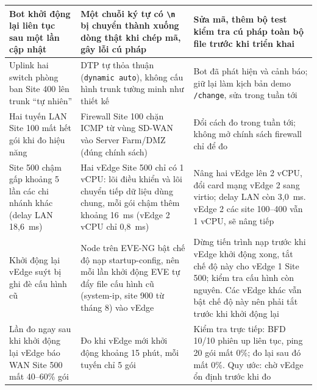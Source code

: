 \begin{longtable}{|P{3.4cm}|P{4.6cm}|P{4.8cm}|}
    \hline
    Bot khởi động lại liên tục sau một lần cập nhật & Một chuỗi ký tự có \texttt{\textbackslash n} bị chuyển thành xuống dòng thật khi chép mã, gây lỗi cú pháp & Sửa mã, thêm bộ test kiểm tra cú pháp toàn bộ file trước khi triển khai \\
    \hline
    Uplink hai switch phòng ban Site 400 lên trunk ``tự nhiên'' & DTP tự thỏa thuận (\texttt{dynamic auto}), không cấu hình trunk tường minh như thiết kế & Bot đã phát hiện và cảnh báo; giữ lại làm kịch bản demo \texttt{/change}, sửa trong tuần tới \\
    \hline
    Hai tuyến LAN Site 100 mất hết gói khi đo hiệu năng & Firewall Site 100 chặn ICMP từ vùng SD-WAN vào Server Farm/DMZ (đúng chính sách) & Đổi cách đo trong tuần tới; không mở chính sách firewall chỉ để đo \\
    \hline
    Site 500 chậm gấp khoảng 5 lần các chi nhánh khác (delay LAN 18,6~ms) & Hai vEdge Site 500 chỉ có 1 vCPU: lõi điều khiển và lõi chuyển tiếp dữ liệu dùng chung, mỗi gói chậm thêm khoảng 16~ms (vEdge 2 vCPU chỉ 0,8~ms) & Nâng hai vEdge lên 2 vCPU, đổi card mạng vEdge 2 sang virtio; delay LAN còn 3,0~ms. vEdge 2 các site 100--400 vẫn 1 vCPU, sẽ nâng tiếp \\
    \hline
    Khởi động lại vEdge suýt bị ghi đè cấu hình cũ & Node trên EVE-NG bật chế độ nạp startup-config, nên mỗi lần khởi động EVE tự đẩy file cấu hình cũ (system-ip, site 900 từ tháng 8) vào vEdge & Dừng tiến trình nạp trước khi vEdge khởi động xong, tắt chế độ này cho vEdge 1 Site 500; kiểm tra cấu hình còn nguyên. Các vEdge khác vẫn bật chế độ này nên phải tắt trước khi khởi động lại \\
    \hline
    Lần đo ngay sau khi khởi động lại vEdge báo WAN Site 500 mất 40--60\% gói & Đo khi vEdge mới khởi động khoảng 15 phút, mỗi tuyến chỉ 5 gói & Kiểm tra trực tiếp: BFD 10/10 phiên up liên tục, ping 20 gói mất 0\%; đo lại sau đó mất 0\%. Quy ước: chờ vEdge ổn định trước khi đo \\
\end{longtable}
\endgroup
